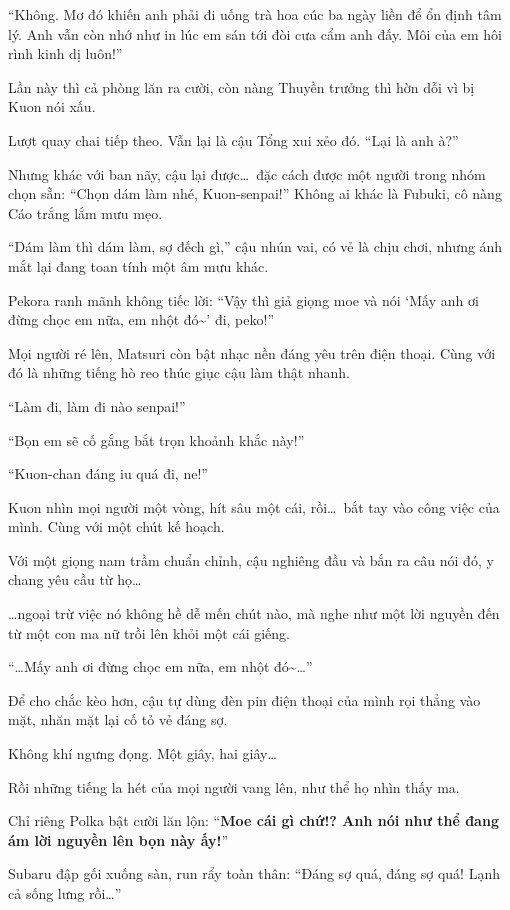 \documentclass[../main.tex]{subfiles}
\begin{document}
``Không. Mơ đó khiến anh phải đi uống trà hoa cúc ba ngày liền để ổn định tâm lý. Anh vẫn còn nhớ như in lúc em sán tới đòi cưa cẩm anh đấy. Môi của em hôi rình kinh dị luôn!''

Lần này thì cả phòng lăn ra cười, còn nàng Thuyền trưởng thì hờn dỗi vì bị Kuon nói xấu.

Lượt quay chai tiếp theo. Vẫn lại là cậu Tổng xui xẻo đó. ``Lại là anh à?''

Nhưng khác với ban nãy, cậu lại được\dots\ đặc cách được một người trong nhóm chọn sẵn: ``Chọn dám làm nhé, Kuon-senpai!'' Không ai khác là Fubuki, cô nàng Cáo trắng lắm mưu mẹo.

``Dám làm thì dám làm, sợ đếch gì,'' cậu nhún vai, có vẻ là chịu chơi, nhưng ánh mắt lại đang toan tính một âm mưu khác.

Pekora ranh mãnh không tiếc lời: ``Vậy thì giả giọng moe và nói `Mấy anh ơi đừng chọc em nữa, em nhột đó\~{}' đi, peko!''

Mọi người ré lên, Matsuri còn bật nhạc nền đáng yêu trên điện thoại. Cùng với đó là những tiếng hò reo thúc giục cậu làm thật nhanh.

``Làm đi, làm đi nào senpai!''

``Bọn em sẽ cố gắng bắt trọn khoảnh khắc này!''

``Kuon-chan đáng iu quá đi, ne!''

Kuon nhìn mọi người một vòng, hít sâu một cái, rồi\dots\ bắt tay vào công việc của mình. Cùng với một chút kế hoạch.

Với một giọng nam trầm chuẩn chỉnh, cậu nghiêng đầu và bắn ra câu nói đó, y chang yêu cầu từ họ\dots

\dots ngoại trừ việc nó không hề dễ mến chút nào, mà nghe như một lời nguyền đến từ một con ma nữ trồi lên khỏi một cái giếng.

``\dots Mấy anh ơi đừng chọc em nữa, em nhột đó\~{}\dots''

Để cho chắc kèo hơn, cậu tự dùng đèn pin điện thoại của mình rọi thẳng vào mặt, nhăn mặt lại cố tỏ vẻ đáng sợ.

Không khí ngưng đọng. Một giây, hai giây\dots

Rồi những tiếng la hét của mọi người vang lên, như thể họ nhìn thấy ma.

Chỉ riêng Polka bật cười lăn lộn: ``\textbf{Moe cái gì chứ!? Anh nói như thể đang ám lời nguyền lên bọn này ấy!}''

Subaru đập gối xuống sàn, run rẩy toàn thân: ``Đáng sợ quá, đáng sợ quá! Lạnh cả sống lưng rồi\dots''
\end{document}
